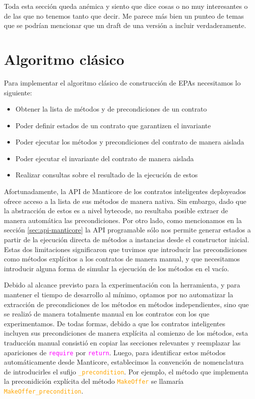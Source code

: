 Toda esta sección queda anémica y siento que dice cosas o no muy interesantes o de las que no tenemos tanto que decir.
Me parece más bien un punteo de temas que se podrían mencionar que un draft de una versión a incluir verdaderamente.

\section{Algoritmo clásico}
Para implementar el algoritmo clásico de construcción de EPAs necesitamos lo siguiente:
\begin{itemize}
    \item Obtener la lista de métodos y de precondiciones de un contrato
    \item Poder definir estados de un contrato que garantizen el invariante
    \item Poder ejecutar los métodos y precondiciones del contrato de manera aislada
    \item Poder ejecutar el invariante del contrato de manera aislada
    \item Realizar consultas sobre el resultado de la ejecución de estos
\end{itemize}
Afortunadamente, la API de Manticore de los contratos inteligentes deployeados ofrece acceso a la lista de sus métodos de manera nativa.
Sin embargo, dado que la abstracción de estos es a nivel bytecode, no resultaba posible extraer de manera automática las precondiciones.
Por otro lado, como mencionamos en la sección \ref{sec:api-manticore} la API programable sólo nos permite generar estados a partir de la ejecución directa de métodos a instancias desde el constructor inicial.
Estas dos limitaciones significaron que tuvimos que introducir las precondiciones como métodos explícitos a los contratos de manera manual, y que necesitamos introducir alguna forma de simular la ejecución de los métodos en el vacío.

Debido al alcance previsto para la experimentación con la herramienta, y para mantener el tiempo de desarrollo al mínimo, optamos por no automatizar la extracción de precondiciones de los métodos en métodos independientes, sino que se realizó de manera totalmente manual en los contratos con los que experimentamos.
De todas formas, debido a que los contratos inteligentes incluyen sus precondiciones de manera explícita al comienzo de los métodos, esta traducción manual consistió en copiar las secciones relevantes y reemplazar las apariciones de \textcolor{magenta}{\texttt{require}} por \textcolor{magenta}{\texttt{return}}.
Luego, para identificar estos métodos automáticamente desde Manticore, establecimos la convención de nomenclatura de introducirles el sufijo \textcolor{orange}{\texttt{\_precondition}}.
Por ejemplo, el método que implementa la preconidición explícita del método \textcolor{orange}{\texttt{MakeOffer}} se llamaría \textcolor{orange}{\texttt{MakeOffer\_precondition}}.

